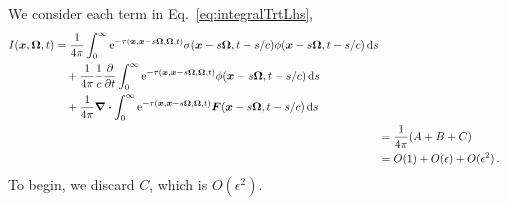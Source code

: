 We consider each term in Eq.~\eqref{eq:integralTrtLhs},
\begin{align*}
    \begin{split}
    I(\bm{x}, \bm{\Omega}, t)
    &=
    \frac{1}{4\pi}\int_{0}^{\infty}
    \mathop{}\!\mathrm{e}^{ -\tau(\bm{x}, \bm{x} - s \bm{\Omega}, \bm{\Omega}, t)}
    \sigma(\bm{x} - s \bm{\Omega}, t-s/c)
    \phi(\bm{x} - s \bm{\Omega}, t-s/c)
    \mathop{}\!\mathrm{d} s
    \\
    &\quad+ \frac{1}{4\pi}\frac{1}{c} \frac{\partial }{\partial t} \int_{0}^{\infty}
    \mathop{}\!\mathrm{e}^{ -\tau(\bm{x}, \bm{x} - s \bm{\Omega}, \bm{\Omega}, t)}
    \phi(\bm{x} - s \bm{\Omega}, t-s/c)
    \mathop{}\!\mathrm{d} s
    \\
    &\quad+ \frac{1}{4\pi}\bm{\nabla} \bm{\cdot} \int_{0}^{\infty}
    \mathop{}\!\mathrm{e}^{ -\tau(\bm{x}, \bm{x} - s \bm{\Omega}, \bm{\Omega}, t)}
    \bm{F}(\bm{x} - s \bm{\Omega}, t-s/c)
    \mathop{}\!\mathrm{d} s
    \end{split}
    \\
    &= \frac{1}{4\pi}(A + B + C)
    \\
    &= O(1) + O(\epsilon)+
    O(\epsilon^2)\,.
\end{align*}
To begin, we discard $C$, which is $O(\epsilon^2)$.

